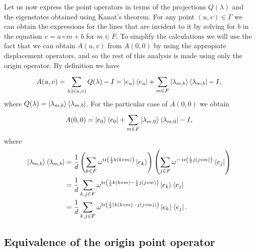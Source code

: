 \documentclass[a4paper, 11pt]{article}
\DeclareMathOperator{\tr}{tr}
\begin{document}
  Let us now express the point operators in terms of the
  projections $Q(\lambda)$ and the eigenstates obtained
  using Kanat's theorem. For any point $(u,v) \in \Gamma$ we
  can obtain the expressions for the lines that are incident
  to it by solving for $b$ in the equation $v = u \circ m +
  b$ for $m \in F$. To simplify the calculations we will use
  the fact that we can obtain $A(u,v)$ from $A(0,0)$ by
  using the appropiate displacement operators, and so the
  rest of this analysis is made using only the origin
  operator. By definition we have
  \begin{equation}
    \label{eqn:point_op}
    A(u,v)
    = \sum_{\lambda \ni (u,v)}^{} Q(\lambda) - I
    = \ket{e_u}\bra{e_u}
    + \sum_{m \in F}^{}
    \ket{\lambda_{m,b}}
    \bra{\lambda_{m,b}} - I,
  \end{equation}
  where $Q(\lambda) =
  \ket{\lambda_{m,b}}\bra{\lambda_{m,b}}$.  For the
  particular case of $A(0,0)$ we obtain
  \begin{equation}
    \label{eqn:origin_op}
    A(0,0)
    = \ket{e_0}\bra{e_0}
    + \sum_{m \in F}^{} \ket{\lambda_{m,0}}
    \bra{\lambda_{m,0}} - I,
  \end{equation}
  where
  \begin{align}
    \ket{\lambda_{m,b}} \bra{\lambda_{m,b}}
    &= \frac{1}{d} \left( 
      \sum_{k \in F}^{} \omega^{\tr\left(
          \frac{1}{2} k (k \circ m)
      \right)} \ket{e_k}
    \right) \left( 
      \sum_{j \in F}^{} \omega^{-\tr\left(
          \frac{1}{2} j (j \circ m)
      \right)} \bra{e_j}
    \right) \\
    &= \frac{1}{d} \sum_{k, j \in F}^{} 
    \omega^{\tr\left( 
        \frac{1}{2} k (k\circ m) - \frac{1}{2} j (j
        \circ m) 
    \right) } \ket{e_k} \bra{e_j} \\
    &= \frac{1}{d} \sum_{k, j \in F}^{} 
    \omega^{\tr\left( 
        \frac{1}{2} \left( k(k \circ m) - j (j\circ m) \right)
    \right) } \ket{e_k} \bra{e_j}.
  \end{align}

  \subsection{Equivalence of the origin point operator}
\end{document}
